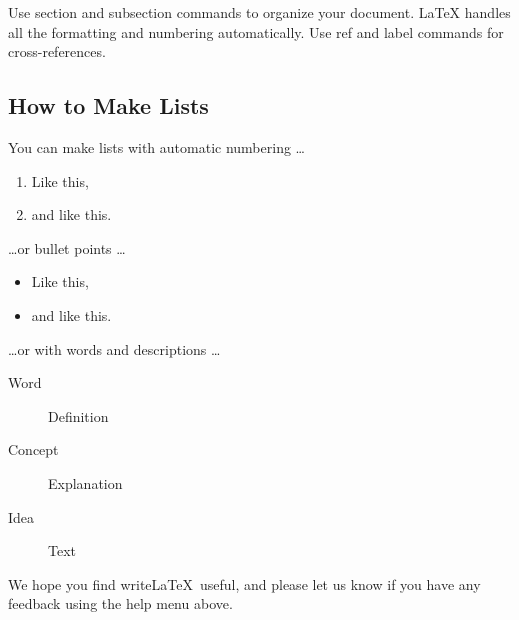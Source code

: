 \documentclass[]{article}%
\begin{document}
Use section and subsection commands to organize your document. \LaTeX{} handles all the formatting and numbering automatically. Use ref and label commands for cross-references.

\subsection{How to Make Lists}

You can make lists with automatic numbering \dots

\begin{enumerate}
\item Like this,
\item and like this.
\end{enumerate}
\dots or bullet points \dots
\begin{itemize}
\item Like this,
\item and like this.
\end{itemize}
\dots or with words and descriptions \dots
\begin{description}
\item[Word] Definition
\item[Concept] Explanation
\item[Idea] Text
\end{description}

We hope you find write\LaTeX\ useful, and please let us know if you have any feedback using the help menu above.
\end{document}
